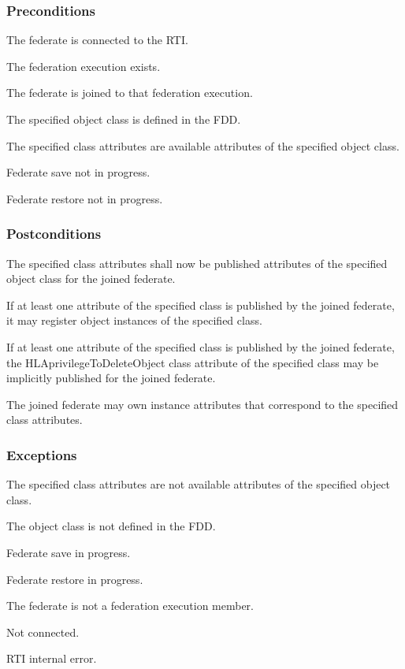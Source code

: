 \begin{compactstdpage}
    \subsubsection{Preconditions}
    \begin{stdalphalist}
        \item The federate is connected to the RTI.
        \item The federation execution exists.
        \item The federate is joined to that federation execution.
        \item The specified object class is defined in the FDD.
        \item The specified class attributes are available attributes of the specified object class.
        \item Federate save not in progress.
        \item Federate restore not in progress.
    \end{stdalphalist}

    \subsubsection{Postconditions}
    \begin{stdalphalist}
        \item The specified class attributes shall now be published attributes of the specified object class for the joined federate.
        \item If at least one attribute of the specified class is published by the joined federate, it may register object instances of the specified class.
        \item If at least one attribute of the specified class is published by the joined federate, the HLAprivilegeToDeleteObject class attribute of the specified class may be implicitly published for the joined federate.
        \item The joined federate may own instance attributes that correspond to the specified class attributes.
    \end{stdalphalist}

    \subsubsection{Exceptions}
    \begin{stdalphalist}
        \item The specified class attributes are not available attributes of the specified object class.
        \item The object class is not defined in the FDD.
        \item Federate save in progress.
        \item Federate restore in progress.
        \item The federate is not a federation execution member.
        \item Not connected.
        \item RTI internal error.
    \end{stdalphalist}


\end{compactstdpage}
